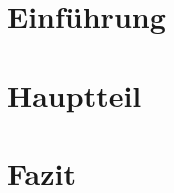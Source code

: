\section{Einführung}\label{sec:intro}
% 

\newpage
\section{Hauptteil}\label{sec:main}
% 

\newpage
\section{Fazit}\label{sec:conclusion}
% 
